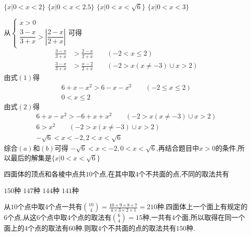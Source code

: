 \documentclass[answers]{exam}
\begin{document}
\begin{questions}
	\begin{oneparchoices}
		\choice $\{x|0< x < 2\}$
		\choice $\{x|0< x < 2.5\}$
		\CorrectChoice $\{x|0< x < \sqrt{6}\}$
		\choice $\{x|0< x < 3\}$
	\end{oneparchoices}

	\begin{solution}
		从\begin{math}
			\begin{cases}
				x> 0 \\
				\dfrac{3-x}{3+x} > \left|\dfrac{2-x}{2+x}\right|
			\end{cases}
		\end{math}可得
		\begin{align*}
			\frac{3-x}{3+x} & > \frac{2-x}{2+x} \qquad (-2 < x \leqslant 2) \tag{1}          \\
			\frac{3-x}{3+x} & > \frac{x-2}{2+x}  \qquad (-2 > x(x\neq-3) \cup x > 2) \tag{2}
		\end{align*}
		由式$(1)$得
		\begin{align*}
			6+x-x^2> 6-x -x^2 \qquad (-2 \leqslant x \leqslant 2) \\
			0 < x \leqslant 2 \tag{a}
		\end{align*}
		由式$(2)$得
		\begin{align*}
			6 +x - x^2 > -6 +x + x^2 \qquad (-2 > x(x\neq-3) \cup x > 2) \\
			6 > x^2 \qquad (-2 > x (x\neq-3) \cup x > 2)                 \\
			-\sqrt{6} < x < -2, 2 < x < \sqrt{6} \tag{b}
		\end{align*}
		综合$(a)$和$(b)$可得 $-\sqrt{6}<x < -2, 0< x <
			\sqrt{6}$,再结合题目中$x>0$的条件,所以最后的解集是$\{x|0<x<\sqrt{6}\}$
	\end{solution}

	\question 四面体的顶点和各棱中点共$10$个点,在其中取$4$个不共面的点,不同的取法共有 \hfs

	\begin{oneparchoices}
		\CorrectChoice $150$种
		\choice $147$种
		\choice $144$种
		\choice $141$种
	\end{oneparchoices}

	\begin{solution}
		从$10$个点中取$4$个点一共有$\binom{10}{4}=\frac{10\times9\times8\times7}{4\times3\times2\times1}=210$种.四面体上一个面上有规定的$6$个点,从这$6$个点中取$4$个点的取法有$\binom{6}{4}=15$种,一共有$4$个面,所以取得在同一个面上的$4$个点的取法有$60$种.则取$4$个不共面的点的取法共有$150$种.
	\end{solution}


\end{questions}
\end{document}
